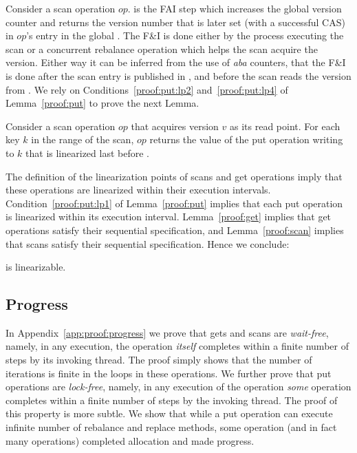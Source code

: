 Consider a scan operation $op$.  is the FAI step which increases the global version counter and returns the version number that is later set (with a successful CAS) in $op$'s entry in the global . The F\&I is done either by the process executing the scan or a concurrent rebalance operation which helps the scan acquire the version. Either way it can be inferred from the use of \emph{aba} counters, that the F\&I is done after the scan entry is published in  , and before the scan reads the version from  .
We rely on Conditions~\ref{proof:put:lp2} and~\ref{proof:put:lp4} of Lemma~\ref{proof:put}
to prove the next Lemma.

\begin{lemma}
\label{proof:scan}
Consider a scan operation $op$ that acquires version $v$ as its read point. For each key $k$ in the range of the scan, $op$ returns the value of the put operation writing to $k$ that is linearized last before .
\end{lemma}

The definition of the linearization points of scans and get operations imply that these operations are linearized within their execution intervals.
Condition~\ref{proof:put:lp1} of Lemma~\ref{proof:put} implies that each put operation is linearized within its execution interval. Lemma~\ref{proof:get} implies that get operations satisfy their sequential specification, and Lemma~\ref{proof:scan} implies that scans satisfy their sequential specification. Hence we conclude:

\begin{theorem}
{\kiwi} is linearizable.
\end{theorem}


\subsection{Progress}

In Appendix~\ref{app:proof:progress} we prove that {\kiwi} gets and scans are \emph{wait-free}, namely, in any execution, the operation \emph{itself} completes within a finite number of steps by its invoking thread. The proof simply shows that the number of iterations is finite in the loops in these operations. We further prove that {\kiwi} put operations are \emph{lock-free}, namely, in any execution of the operation \emph{some} operation completes within a finite number of steps by the invoking thread. The proof of this property is more subtle. We show that while a put operation can execute infinite number of rebalance and replace methods, some operation (and in fact many operations) completed allocation and made progress.

